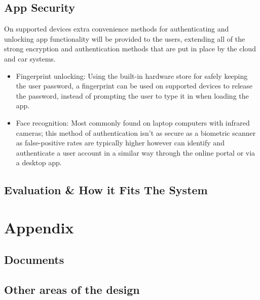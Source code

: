 \documentclass{article}
\begin{document}
\subsection{App Security}\label{ssec:app-security}
On supported devices extra convenience methods for authenticating and unlocking app functionality will be provided to the users, extending all of the strong encryption and authentication methods that are put in place by the cloud and car systems.
\begin{itemize}
	\item Fingerprint unlocking: Using the built-in hardware store for safely keeping the user password, a fingerprint can be used on supported devices to release the password, instead of prompting the user to type it in when loading the app.
    \item Face recognition: Most commonly found on laptop computers with infrared cameras; this method of authentication isn't as secure as a biometric scanner as false-positive rates are typically higher however can identify and authenticate a user account in a similar way through the online portal or via a desktop app.
\end{itemize}


\subsection{Evaluation \& How it Fits The System}\label{ssec:app-evaluation}



\printbibliography

\section{Appendix}\label{sec:appendix}
\subsection{Documents}\label{ssec:appendix-docs}

\subsection{Other areas of the design}\label{ssec:appendix-other}
\end{document}
